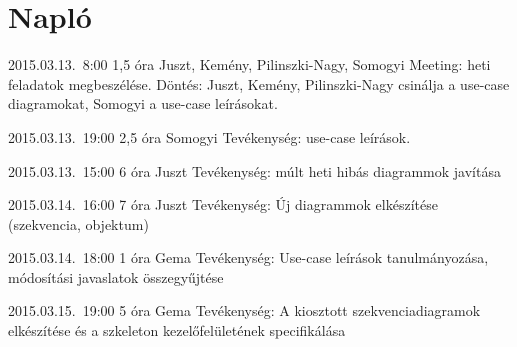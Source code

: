 %
\section{Napló}

\begin{naplo}

\bejegyzes
{2015.03.13.~8:00} %
{1,5 óra} %
{Juszt, Kemény, Pilinszki-Nagy, Somogyi} %
{Meeting: heti feladatok megbeszélése. Döntés: Juszt, Kemény, Pilinszki-Nagy csinálja a use-case diagramokat, Somogyi a use-case leírásokat.} %

\bejegyzes
{2015.03.13.~19:00} %
{2,5 óra} %
{Somogyi} %
{Tevékenység: use-case leírások.} %

\bejegyzes
{2015.03.13.~15:00} %
{6 óra} %
{Juszt} %
{Tevékenység: múlt heti hibás diagrammok javítása} %

\bejegyzes
{2015.03.14.~16:00} %
{7 óra} %
{Juszt} %
{Tevékenység: Új diagrammok elkészítése (szekvencia, objektum)} %

\bejegyzes
{2015.03.14.~18:00}
{1 óra}
{Gema}
{Tevékenység: Use-case leírások tanulmányozása, módosítási javaslatok összegyűjtése}

\bejegyzes
{2015.03.15.~19:00}
{5 óra}
{Gema}
{Tevékenység: A kiosztott szekvenciadiagramok elkészítése és a szkeleton kezelőfelületének specifikálása}

\end{naplo}

